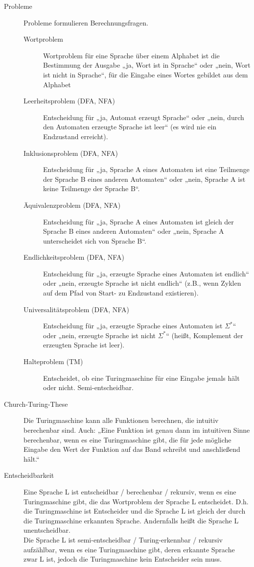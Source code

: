 \begin{description}
    \newpage
    \item[Probleme] Probleme formulieren Berechnungsfragen.
        \begin{description}
            \item[Wortproblem] Wortproblem für eine Sprache über einem Alphabet ist die Bestimmung der Ausgabe „ja, Wort ist in Sprache“ oder „nein, Wort ist nicht in Sprache“, für die Eingabe eines Wortes gebildet aus dem Alphabet 
            \item[Leerheitsproblem (DFA, NFA)] Entscheidung für „ja, Automat erzeugt Sprache“ oder „nein, durch den Automaten erzeugte Sprache ist leer“ (es wird nie ein Endzustand erreicht). 
            \item[Inklusionsproblem (DFA, NFA)] Entscheidung für „ja, Sprache A eines Automaten ist eine Teilmenge der Sprache B eines anderen Automaten“ oder „nein, Sprache A ist keine Teilmenge der Sprache B“. 
            \item[Äquivalenzproblem (DFA, NFA)] Entscheidung für „ja, Sprache A eines Automaten ist gleich der Sprache B eines anderen Automaten“ oder „nein, Sprache A unterscheidet sich von Sprache B“. 
            \item[Endlichkeitsproblem (DFA, NFA)] Entscheidung für „ja, erzeugte Sprache eines Automaten ist endlich“ oder „nein, erzeugte Sprache ist nicht endlich“ (z.B., wenn Zyklen auf dem Pfad von Start- zu Endzustand existieren). 
            \item[Universalitätsproblem (DFA, NFA)] Entscheidung für „ja, erzeugte Sprache eines Automaten ist $\Sigma^*$“ oder „nein, erzeugte Sprache ist nicht $\Sigma^*$“ (heißt, Komplement der erzeugten Sprache ist leer). 
            \item[Halteproblem (TM)] Entscheidet, ob eine Turingmaschine für eine Eingabe jemals hält oder nicht. Semi-entscheidbar. 
        \end{description}

    \item[Church-Turing-These]
        Die Turingmaschine kann alle Funktionen berechnen, die intuitiv berechenbar sind. Auch: „Eine Funktion ist genau dann
        im intuitiven Sinne berechenbar, wenn es eine Turingmaschine gibt, die für jede mögliche Eingabe den Wert der Funktion auf
        das Band schreibt und anschließend hält.“ 

    \item[Entscheidbarkeit]
        Eine Sprache L ist entscheidbar / berechenbar / rekursiv, wenn es eine Turingmaschine gibt, die das Wortproblem der Sprache L entscheidet.
        D.h. die Turingmaschine ist Entscheider und die Sprache L ist gleich der durch die Turingmaschine erkannten Sprache.
        Andernfalls heißt die Sprache L unentscheidbar. \\
        Die Sprache L ist semi-entscheidbar / Turing-erkennbar / rekursiv aufzählbar, wenn es eine Turingmaschine gibt, deren erkannte Sprache zwar L ist, jedoch die Turingmaschine kein Entscheider sein muss. 


\end{description}

